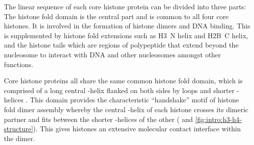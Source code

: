       The linear sequence of each core histone protein can be divided
      into three parts: The histone fold domain is the central part and
      is common to all four core histones.  It is
      involved in the formation of histone dimers and DNA binding.
      This is supplemented by histone fold extensions such as
      H3~\textalpha{}N helix and H2B~\textalpha{}C helix,
      and the histone tails which are regions of polypeptide
      that extend beyond the nucleosome to interact with DNA and
      other nucleosomes amongst other functions.

      Core histone proteins all share the same common
      histone fold domain, which is comprised of a long central
      \textalpha-helix flanked on both sides by loops
      and shorter \textalpha-helices \citep{arents1991-31angstrom, arents1995histone-fold}.
      This domain provides the characteristic ``handshake'' motif
      of histone fold dimer assembly whereby
      the central \textalpha-helix of each
      histone crosses its dimeric partner and fits between the shorter
      \textalpha-helices of the other (
      and \ref{fig:intro:h3-h4-structure}).
      This gives histones an extensive molecular contact interface
      within the dimer.

